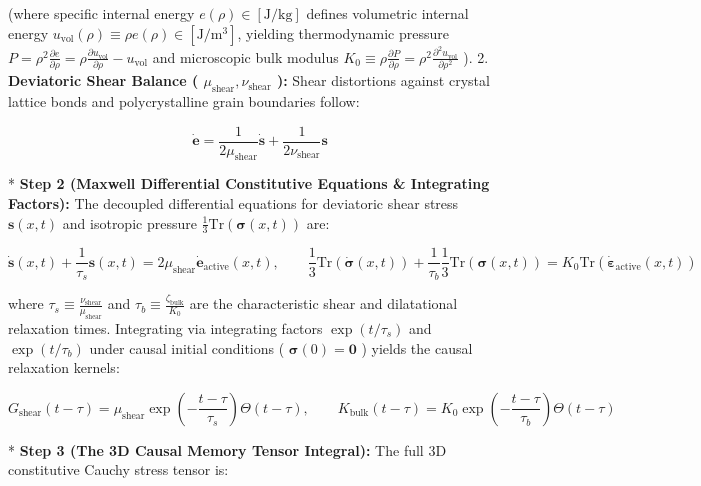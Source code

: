 \documentclass[11pt,a4paper]{article}
\theoremstyle{definition}\newtheorem{definition}{Definition}
\theoremstyle{remark}\newtheorem{remark}{Remark}
\begin{document}
(where specific internal energy $e(\rho) \in [\mathrm{J/kg}]$ defines volumetric internal energy $u_{\text{vol}}(\rho) \equiv \rho e(\rho) \in [\mathrm{J/m^3}]$, yielding thermodynamic pressure $P = \rho^2 \frac{\partial e}{\partial \rho} = \rho \frac{\partial u_{\text{vol}}}{\partial \rho} - u_{\text{vol}}$ and microscopic bulk modulus $K_0 \equiv \rho \frac{\partial P}{\partial \rho} = \rho^2 \frac{\partial^2 u_{\text{vol}}}{\partial \rho^2}$ ).
2. \textbf{Deviatoric Shear Balance ( $\mu_{\text{shear}}, \nu_{\text{shear}}$ ):}
Shear distortions against crystal lattice bonds and polycrystalline grain boundaries follow:


\begin{equation}
\dot{\mathbf{e}} = \frac{1}{2 \mu_{\text{shear}}} \dot{\mathbf{s}} + \frac{1}{2 \nu_{\text{shear}}} \mathbf{s}
\end{equation}


* \textbf{Step 2 (Maxwell Differential Constitutive Equations \& Integrating Factors):}
The decoupled differential equations for deviatoric shear stress $\mathbf{s}(x, t)$ and isotropic pressure $\frac{1}{3}\mathrm{Tr}(\boldsymbol{\sigma}(x, t))$ are:


\begin{equation}
\boxed{\dot{\mathbf{s}}(x, t) + \frac{1}{\tau_s} \mathbf{s}(x, t) = 2 \mu_{\text{shear}} \dot{\mathbf{e}}_{\text{active}}(x, t), \qquad \frac{1}{3}\mathrm{Tr}(\dot{\boldsymbol{\sigma}}(x, t)) + \frac{1}{\tau_b} \frac{1}{3}\mathrm{Tr}(\boldsymbol{\sigma}(x, t)) = K_0 \mathrm{Tr}(\dot{\boldsymbol{\varepsilon}}_{\text{active}}(x, t))}
\end{equation}


where $\tau_s \equiv \frac{\nu_{\text{shear}}}{\mu_{\text{shear}}}$ and $\tau_b \equiv \frac{\zeta_{\text{bulk}}}{K_0}$ are the characteristic shear and dilatational relaxation times.
Integrating via integrating factors $\exp(t/\tau_s)$ and $\exp(t/\tau_b)$ under causal initial conditions ( $\boldsymbol{\sigma}(0) = \mathbf{0}$ ) yields the causal relaxation kernels:


\begin{equation}
G_{\text{shear}}(t - \tau) = \mu_{\text{shear}} \exp\left( -\frac{t - \tau}{\tau_s} \right) \Theta(t - \tau), \qquad K_{\text{bulk}}(t - \tau) = K_0 \exp\left( -\frac{t - \tau}{\tau_b} \right) \Theta(t - \tau)
\end{equation}


* \textbf{Step 3 (The 3D Causal Memory Tensor Integral):}
The full 3D constitutive Cauchy stress tensor is:
\end{document}
